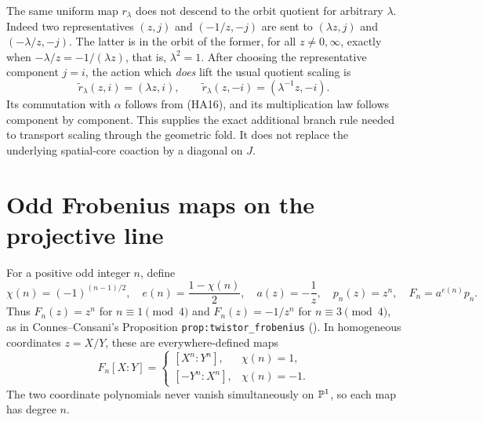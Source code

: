 The same uniform map $r_\lambda$ does not descend to the orbit quotient
for arbitrary $\lambda$. Indeed two representatives $(z,j)$ and
$(-1/z,-j)$ are sent to $(\lambda z,j)$ and $(-\lambda/z,-j)$.
The latter is in the orbit of the former, for all $z\ne0,\infty$,
exactly when $-\lambda/z=-1/(\lambda z)$, that is, $\lambda^2=1$.
After choosing the representative component $j=i$, the action which
\emph{does} lift the usual quotient scaling is
\begin{equation}\tag{HA17}
 \widetilde r_\lambda(z,i)=(\lambda z,i),\qquad
 \widetilde r_\lambda(z,-i)=(\lambda^{-1}z,-i).
\end{equation}
Its commutation with $\alpha$ follows from (HA16), and its multiplication
law follows component by component. This supplies the exact additional
branch rule needed to transport scaling through the geometric fold.
It does not replace the underlying spatial-core coaction by a diagonal
on $J$.

\section{Odd Frobenius maps on the projective line}

For a positive odd integer $n$, define
\begin{equation}\tag{HA18}
 \chi(n)=(-1)^{(n-1)/2},\quad e(n)=\frac{1-\chi(n)}2,
 \quad a(z)=-\frac1z,\quad p_n(z)=z^n,
 \quad F_n=a^{e(n)}p_n.
\end{equation}
Thus $F_n(z)=z^n$ for $n\equiv1\pmod4$ and
$F_n(z)=-1/z^n$ for $n\equiv3\pmod4$, as in Connes--Consani's
Proposition \texttt{prop:twistor\_frobenius}
().
In homogeneous coordinates $z=X/Y$, these are everywhere-defined maps
\begin{equation}\tag{HA19}
 F_n[X:Y]=
 \begin{cases}
 [X^n:Y^n],&\chi(n)=1,\\
 [-Y^n:X^n],&\chi(n)=-1.
 \end{cases}
\end{equation}
The two coordinate polynomials never vanish simultaneously on
$\mathbb P^1$, so each map has degree $n$.

